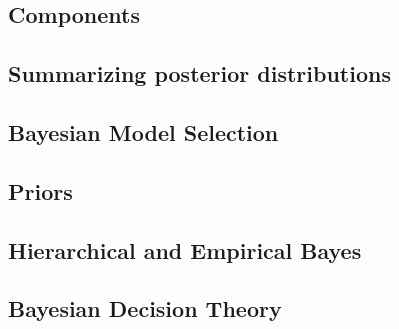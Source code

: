 \subsection{Components}


\subsection{Summarizing posterior distributions}


\subsection{Bayesian Model Selection}

 
\subsection{Priors}


\subsection{Hierarchical and Empirical Bayes}


\subsection{Bayesian Decision Theory}



